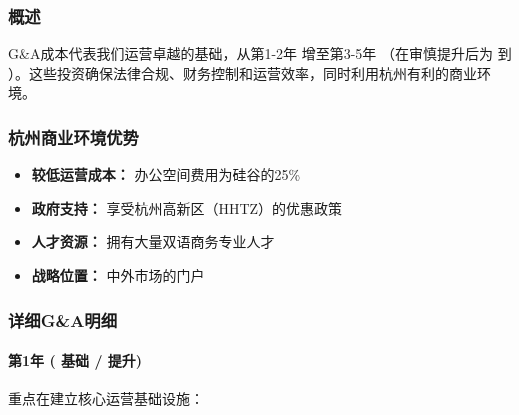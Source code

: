 \documentclass[11点, A4纸, 单面]{article}
\begin{document}
\subsubsection{概述}
G\&A成本代表我们运营卓越的基础，从第1-2年  增至第3-5年 （在审慎提升后为  到 ）。这些投资确保法律合规、财务控制和运营效率，同时利用杭州有利的商业环境。

\subsubsection{杭州商业环境优势}
\begin{itemize}
    \item \textbf{较低运营成本：} 办公空间费用为硅谷的25\%
    \item \textbf{政府支持：} 享受杭州高新区（HHTZ）的优惠政策
    \item \textbf{人才资源：} 拥有大量双语商务专业人才
    \item \textbf{战略位置：} 中外市场的门户
\end{itemize}

\subsubsection{详细G\&A明细}

\paragraph{第1年 ( 基础 /  提升)} 重点在建立核心运营基础设施：
\end{document}
